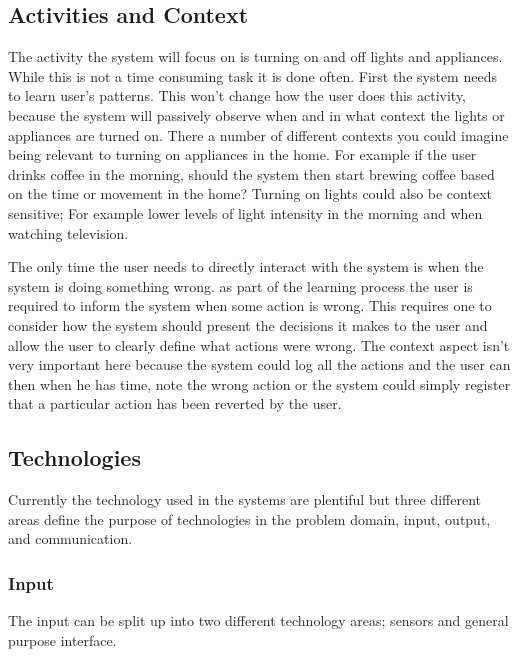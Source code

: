 \subsection{Activities and Context}
The activity the system will focus on is turning on and off lights and
appliances. While this is not a time consuming task it is done often. First the
system needs to learn user's patterns. This won't change how the user does
this activity, because the system will passively observe when and in what
context the lights or appliances are turned on. There a number of different
contexts you could imagine being relevant to turning on appliances in the home.
For example if the user drinks coffee in the morning, should the system then
start brewing coffee based on the time or movement in the home? Turning on
lights could also be context sensitive; For example lower levels of light
intensity in the morning and when watching television.

The only time the user needs to directly interact with the system is when the
system is doing something wrong. as part of the learning process the user is required to inform the system when some action is wrong. This requires one to consider how the system should present the decisions it makes to the user and allow the user to clearly define what actions were wrong. The context aspect isn't very
important here because the system could log all the actions and the user can
then when he has time, note the wrong action or the system could simply register
that a particular action has been reverted by the user.

\subsection{Technologies}
\label{sub:Technologies}
Currently the technology used in the systems are plentiful but three different areas define the purpose of technologies in the problem domain, input, output, and communication.
\subsubsection{Input}
The input can be split up into two different technology areas; sensors and general purpose interface.

